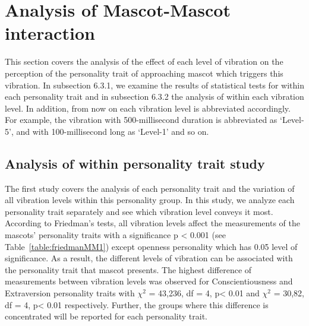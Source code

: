 \section{Analysis of Mascot-Mascot interaction}
\label{M-M}
This section covers the analysis of the effect of each level of vibration on the perception of the personality trait
of approaching mascot which triggers this vibration. In subsection 6.3.1, we examine the results of statistical tests
for within each personality trait and in subsection 6.3.2 the analysis of within each vibration level. In addition,
from now on each vibration level is abbreviated accordingly. For example, the vibration with 500-millisecond duration
is abbreviated as ‘Level-5’, and with 100-millisecond long as ‘Level-1’ and so on.

\subsection{Analysis of within personality trait study}
\label{Study1(M-M)}
The first study covers the analysis of each personality trait and the variation of all vibration levels within this
personality group. In this study, we analyze each personality trait separately and see which vibration level conveys
it most. According to Friedman’s tests, all vibration levels affect the measurements of the mascots’ personality traits
with a significance p < 0.001 (see Table~\ref{table:friedmanMM1}) except openness personality which has 0.05 level of
significance. As a result, the different levels of vibration can be associated with the personality trait that mascot
presents. The highest difference of measurements between vibration levels was observed for Conscientiousness and
Extraversion personality traits with $\chi^2$ = 43,236, df = 4, p< 0.01 and $\chi^2$ = 30,82, df = 4, p< 0.01 respectively.
Further, the groups where this difference is concentrated will be reported for each personality trait.

